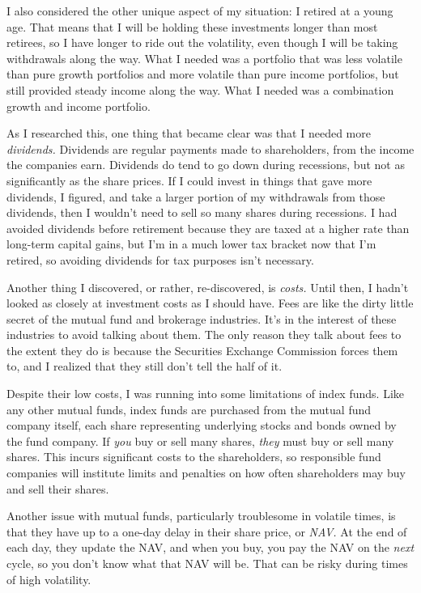 I also considered the other unique aspect of my situation: I retired at a young age. That means that I will be holding these investments longer than most retirees, so I have longer to ride out the volatility, even though I will be taking withdrawals along the way. What I needed was a portfolio that was less volatile than pure growth portfolios and more volatile than pure income portfolios, but still provided steady income along the way. What I needed was a combination growth and income portfolio.

As I researched this, one thing that became clear was that I needed more \emph{dividends.} Dividends are regular payments made to shareholders, from the income the companies earn. Dividends do tend to go down during recessions, but not as significantly as the share prices. If I could invest in things that gave more dividends, I figured, and take a larger portion of my withdrawals from those dividends, then I wouldn't need to sell so many shares during recessions. I had avoided dividends before retirement because they are taxed at a higher rate than long-term capital gains, but I'm in a much lower tax bracket now that I'm retired, so avoiding dividends for tax purposes isn't necessary.

Another thing I discovered, or rather, re-discovered, is \emph{costs.} Until then, I hadn't looked as closely at investment costs as I should have. Fees are like the dirty little secret of the mutual fund and brokerage industries. It's in the interest of these industries to avoid talking about them. The only reason they talk about fees to the extent they do is because the Securities Exchange Commission forces them to, and I realized that they still don't tell the half of it.

Despite their low costs, I was running into some limitations of index funds. Like any other mutual funds, index funds are purchased from the mutual fund company itself, each share representing underlying stocks and bonds owned by the fund company. If \emph{you} buy or sell many shares, \emph{they} must buy or sell many shares. This incurs significant costs to the shareholders, so responsible fund companies will institute limits and penalties on how often shareholders may buy and sell their shares.

Another issue with mutual funds, particularly troublesome in volatile times, is that they have up to a one-day delay in their share price, or \emph{NAV.} At the end of each day, they update the NAV, and when you buy, you pay the NAV on the \emph{next} cycle, so you don't know what that NAV will be. That can be risky during times of high volatility.

